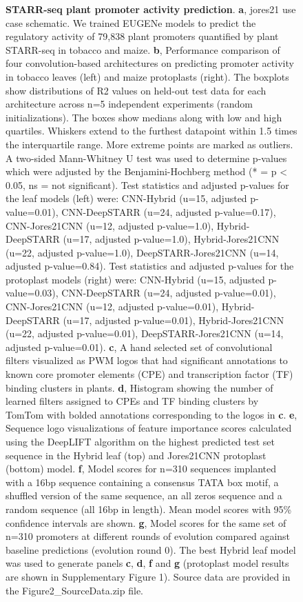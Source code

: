 \begin{figure}[p]
    \caption[STARR-seq plant promoter activity prediction]{\textbf{STARR-seq plant promoter activity prediction}. \textbf{a}, jores21 use case schematic. We trained EUGENe models to predict the regulatory activity of 79,838 plant promoters quantified by plant STARR-seq in tobacco and maize. \textbf{b}, Performance comparison of four convolution-based architectures on predicting promoter activity in tobacco leaves (left) and maize protoplasts (right). The boxplots show distributions of R2 values on held-out test data for each architecture across n=5 independent experiments (random initializations). The boxes show medians along with low and high quartiles. Whiskers extend to the furthest datapoint within 1.5 times the interquartile range. More extreme points are marked as outliers. A two-sided Mann-Whitney U test was used to determine p-values which were adjusted by the Benjamini-Hochberg method (* = p < 0.05, ns = not significant). Test statistics and adjusted p-values for the leaf models (left) were: CNN-Hybrid (u=15, adjusted p-value=0.01), CNN-DeepSTARR (u=24, adjusted p-value=0.17), CNN-Jores21CNN (u=12, adjusted p-value=1.0), Hybrid-DeepSTARR (u=17, adjusted p-value=1.0), Hybrid-Jores21CNN (u=22, adjusted p-value=1.0), DeepSTARR-Jores21CNN (u=14, adjusted p-value=0.84). Test statistics and adjusted p-values for the protoplast models (right) were: CNN-Hybrid (u=15, adjusted p-value=0.03), CNN-DeepSTARR (u=24, adjusted p-value=0.01), CNN-Jores21CNN (u=12, adjusted p-value=0.01), Hybrid-DeepSTARR (u=17, adjusted p-value=0.01), Hybrid-Jores21CNN (u=22, adjusted p-value=0.01), DeepSTARR-Jores21CNN (u=14, adjusted p-value=0.01). \textbf{c}, A hand selected set of convolutional filters visualized as PWM logos that had significant annotations to known core promoter elements (CPE) and transcription factor (TF) binding clusters in plants. \textbf{d}, Histogram showing the number of learned filters assigned to CPEs and TF binding clusters by TomTom with bolded annotations corresponding to the logos in \textbf{c}. \textbf{e}, Sequence logo visualizations of feature importance scores calculated using the DeepLIFT algorithm on the highest predicted test set sequence in the Hybrid leaf (top) and Jores21CNN protoplast (bottom) model. \textbf{f}, Model scores for n=310 sequences implanted with a 16bp sequence containing a consensus TATA box motif, a shuffled version of the same sequence, an all zeros sequence and a random sequence (all 16bp in length). Mean model scores with 95\% confidence intervals are shown. \textbf{g}, Model scores for the same set of n=310 promoters at different rounds of evolution compared against baseline predictions (evolution round 0). The best Hybrid leaf model was used to generate panels \textbf{c}, \textbf{d}, \textbf{f} and \textbf{g} (protoplast model results are shown in Supplementary Figure 1). Source data are provided in the Figure2\_SourceData.zip file.}
    \label{fig:1 Figure 2}
\end{figure}

